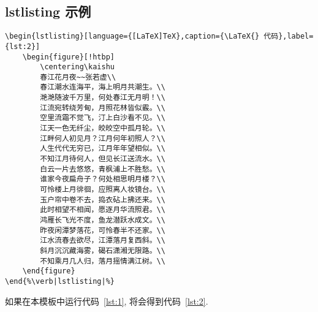 \documentclass[timesfont,no-math]{JXUSTmodeling}%
\begin{document}
	\subsection{lstlisting 示例}
	\begin{figure*}[!htbp]
		\centering
	\begin{lstlisting}[language={[LaTeX]TeX},caption={\LaTeX{} 代码实例},label={lst:1},escapechar=\%]
\begin{lstlisting}[language={[LaTeX]TeX},caption={\LaTeX{} 代码},label={lst:2}]
	\begin{figure}[!htbp]
		\centering\kaishu
		春江花月夜~~张若虚\\
		春江潮水连海平，海上明月共潮生。\\
		滟滟随波千万里，何处春江无月明！\\
		江流宛转绕芳甸，月照花林皆似霰。\\
		空里流霜不觉飞，汀上白沙看不见。\\
		江天一色无纤尘，皎皎空中孤月轮。\\
		江畔何人初见月？江月何年初照人？\\
		人生代代无穷已，江月年年望相似。\\
		不知江月待何人，但见长江送流水。\\
		白云一片去悠悠，青枫浦上不胜愁。\\
		谁家今夜扁舟子？何处相思明月楼？\\
		可怜楼上月徘徊，应照离人妆镜台。\\
		玉户帘中卷不去，捣衣砧上拂还来。\\
		此时相望不相闻，愿逐月华流照君。\\
		鸿雁长飞光不度，鱼龙潜跃水成文。\\
		昨夜闲潭梦落花，可怜春半不还家。\\
		江水流春去欲尽，江潭落月复西斜。\\
		斜月沉沉藏海雾，碣石潇湘无限路。\\
		不知乘月几人归，落月摇情满江树。\\
	\end{figure}
\end{%\verb|lstlisting|%}
	\end{lstlisting}
		如果在本模板中运行代码~\ref{lst:1}, 将会得到代码~\ref{lst:2}.
	\end{figure*}
\end{document}
